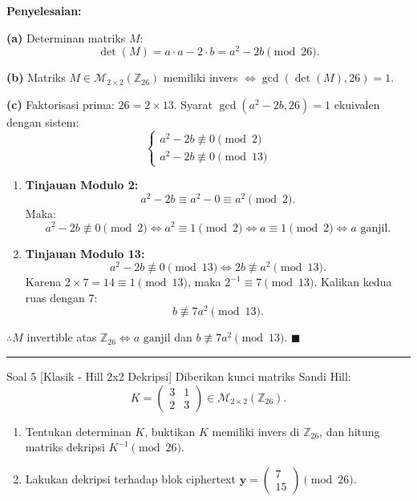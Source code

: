 \documentclass[11pt,a4paper]{article}
\newenvironment{solusi}{\noindent\textbf{\textsf{Penyelesaian:}}\par\vspace{0.2em}}{\hfill$\blacksquare$\vspace{1em}\par\hrule\vspace{1em}}
\begin{document}
\begin{solusi}
\textbf{(a)} Determinan matriks $M$:
\[
\det(M) = a \cdot a - 2 \cdot b = a^2 - 2b \pmod{26}.
\]

\textbf{(b)} Matriks $M \in \mathcal{M}_{2 \times 2}(\mathbb{Z}_{26})$ memiliki invers $\iff \gcd(\det(M), 26) = 1$.

\textbf{(c)} Faktorisasi prima: $26 = 2 \times 13$. Syarat $\gcd(a^2 - 2b, 26) = 1$ ekuivalen dengan sistem:
\[
\begin{cases}
a^2 - 2b \not\equiv 0 \pmod 2 \\
a^2 - 2b \not\equiv 0 \pmod{13}
\end{cases}
\]
\begin{enumerate}[leftmargin=*]
    \item \textbf{Tinjauan Modulo 2:}
    \[
    a^2 - 2b \equiv a^2 - 0 \equiv a^2 \pmod 2.
    \]
    Maka:
    \[
    a^2 - 2b \not\equiv 0 \pmod 2 \iff a^2 \equiv 1 \pmod 2 \iff a \equiv 1 \pmod 2 \iff a \text{ ganjil}.
    \]
    
    \item \textbf{Tinjauan Modulo 13:}
    \[
    a^2 - 2b \not\equiv 0 \pmod{13} \iff 2b \not\equiv a^2 \pmod{13}.
    \]
    Karena $2 \times 7 = 14 \equiv 1 \pmod{13}$, maka $2^{-1} \equiv 7 \pmod{13}$. Kalikan kedua ruas dengan 7:
    \[
    b \not\equiv 7a^2 \pmod{13}.
    \]
\end{enumerate}
$\therefore M$ invertible atas $\mathbb{Z}_{26} \iff a \text{ ganjil}$ dan $b \not\equiv 7a^2 \pmod{13}$.
\end{solusi}

\begin{soalklasik}{Soal 5 [Klasik - Hill 2x2 Dekripsi]}
Diberikan kunci matriks Sandi Hill:
\[
K = \begin{pmatrix} 3 & 1 \\ 2 & 3 \end{pmatrix} \in \mathcal{M}_{2 \times 2}(\mathbb{Z}_{26}).
\]
\begin{enumerate}[label=(\alph*)]
    \item Tentukan determinan $K$, buktikan $K$ memiliki invers di $\mathbb{Z}_{26}$, dan hitung matriks dekripsi $K^{-1} \pmod{26}$.
    \item Lakukan dekripsi terhadap blok ciphertext $\mathbf{y} = \begin{pmatrix} 7 \\ 15 \end{pmatrix} \pmod{26}$.
\end{enumerate}
\end{soalklasik}
\end{document}
